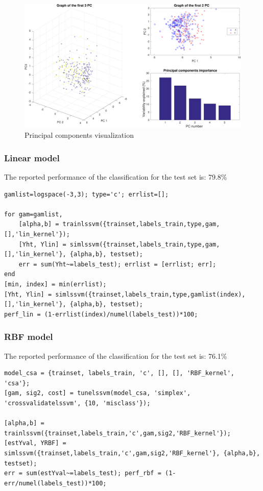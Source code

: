 \documentclass[11pt, a4paper]{article}
\begin{document}
\begin{figure}[H]
    \centering
    \includegraphics[scale=.40]{diabetes_pcaviz.pdf}
    \caption{Principal components visualization}
    \label{fig:diabetes_pcaviz}
\end{figure}

\subsubsection{Linear model}

The reported performance of the classification for the test set is: 79.8\%

\begin{lstlisting}
gamlist=logspace(-3,3); type='c'; errlist=[];

for gam=gamlist,
    [alpha,b] = trainlssvm({trainset,labels_train,type,gam,[],'lin_kernel'});
    [Yht, Ylin] = simlssvm({trainset,labels_train,type,gam,[],'lin_kernel'}, {alpha,b}, testset);
    err = sum(Yht~=labels_test); errlist = [errlist; err];
end
[min, index] = min(errlist);
[Yht, Ylin] = simlssvm({trainset,labels_train,type,gamlist(index),[],'lin_kernel'}, {alpha,b}, testset);
perf_lin = (1-errlist(index)/numel(labels_test))*100;
\end{lstlisting}

\subsubsection{RBF model}

The reported performance of the classification for the test set is: 76.1\%

\begin{lstlisting}
model_csa = {trainset, labels_train, 'c', [], [], 'RBF_kernel', 'csa'};
[gam, sig2, cost] = tunelssvm(model_csa, 'simplex', 'crossvalidatelssvm', {10, 'misclass'});

[alpha,b] = trainlssvm({trainset,labels_train,'c',gam,sig2,'RBF_kernel'});
[estYval, YRBF] = simlssvm({trainset,labels_train,'c',gam,sig2,'RBF_kernel'}, {alpha,b}, testset);
err = sum(estYval~=labels_test); perf_rbf = (1-err/numel(labels_test))*100;
\end{lstlisting}
\end{document}

